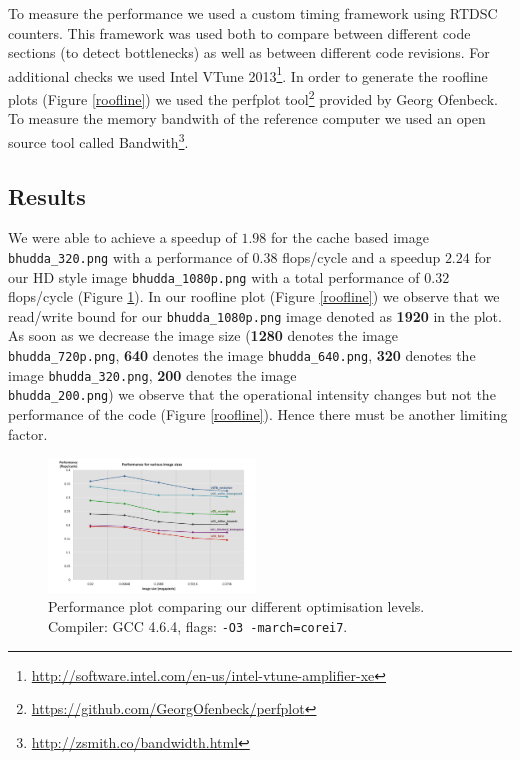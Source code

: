 To measure the performance we used a custom timing framework using RTDSC counters. This framework was used both to compare between different code sections (to detect bottlenecks) as well as between different code revisions. 
For additional checks we used Intel VTune 2013\footnote{\url{http://software.intel.com/en-us/intel-vtune-amplifier-xe}}. 
In order to generate the roofline plots (Figure \ref{roofline}) we used the perfplot tool\footnote{\url{https://github.com/GeorgOfenbeck/perfplot}} provided by Georg Ofenbeck. 
To measure the memory bandwith of the reference computer we used an open source tool called Bandwith\footnote{\url{http://zsmith.co/bandwidth.html}}.
\subsection{Results}
We were able to achieve a speedup of $1.98$ for the cache based image \texttt{bhudda\_320.png} with a performance of $0.38$ flops/cycle and a speedup $2.24$ for our HD style image \newline\texttt{bhudda\_1080p.png} with a total performance of $0.32$ flops/cycle (Figure \ref{performance}). In our roofline plot \cite{Williams:2009:RIV:1498765.1498785} (Figure \ref{roofline}) we observe that we read/write bound for our \texttt{bhudda\_1080p.png} image denoted as \textbf{1920} in the plot. As soon as we decrease the image size (\textbf{1280} denotes the image \texttt{bhudda\_720p.png}, \textbf{640} denotes the image \texttt{bhudda\_640.png}, \textbf{320} denotes the image \texttt{bhudda\_320.png}, \textbf{200} denotes the image \\ \texttt{bhudda\_200.png}) we observe that the operational intensity changes but not the performance of the code (Figure \ref{roofline}). Hence there must be another limiting factor. 

\setlength\fboxsep{0pt}
\setlength\fboxrule{0.5pt}
 
\begin{figure}\vspace{-10mm}
  \includegraphics[trim=10mm 0mm 10mm 0mm, clip, width=0.49\textwidth]{figures/performance}
  \caption{Performance plot comparing our different optimisation levels. Compiler: GCC 4.6.4, flags: \lstinline{-O3 -march=corei7}.\label{performance}}
\end{figure}
 
